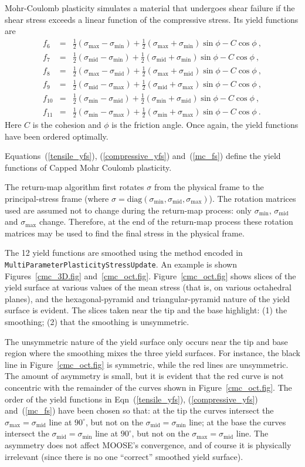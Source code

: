 \documentclass[]{scrreprt}
\newcommand{\ha}{\mbox{$\frac{1}{2}$}}
\newcommand{\smax}{\sigma_{\mathrm{max}}}
\newcommand{\smid}{\sigma_{\mathrm{mid}}}
\newcommand{\smin}{\sigma_{\mathrm{min}}}
\begin{document}
Mohr-Coulomb plasticity simulates a material that undergoes shear
failure if the shear stress exceeds a linear function of the
compressive stress.  Its yield functions are
\begin{eqnarray}
f_{6} & = & \ha (\smax - \smin) +
\ha(\smax+\smin)\sin\phi - C\cos\phi \ , \nonumber \\
f_{7} & = & \ha (\smid - \smin) +
\ha(\smid+\smin)\sin\phi - C\cos\phi \ , \nonumber \\
f_{8} & = & \ha (\smax - \smid) +
\ha(\smax+\smid)\sin\phi - C\cos\phi \ , \nonumber \\
f_{9} & = & \ha (\smid - \smax) +
\ha(\smid+\smax)\sin\phi - C\cos\phi \ , \nonumber \\
f_{10} & = & \ha (\smin - \smid) +
\ha(\smin+\smid)\sin\phi - C\cos\phi \ , \nonumber \\
f_{11} & = & \ha (\smin - \smax) +
\ha(\smin+\smax)\sin\phi - C\cos\phi \ .
\label{mc_fs}
\end{eqnarray}
Here $C$ is the cohesion and $\phi$ is the friction angle.  Once
again, the yield functions have been ordered optimally.

Equations~(\ref{tensile_yfs}), (\ref{compressive_yfs})
and~(\ref{mc_fs}) define the yield functions of Capped Mohr Coulomb plasticity.

The return-map algorithm first rotates $\sigma$ from the physical
frame to the
principal-stress frame (where $\sigma = \mbox{diag}(\smin, \smid,
\smax)$).  The rotation matrices used are assumed not to change
during the return-map process: only $\smin$, $\smid$ and
$\smax$ change.  Therefore, at the end of the
return-map process these rotation matrices may be used to find the
final stress in the physical frame.

The 12 yield functions are smoothed using the method encoded in {\tt
  MultiParameterPlasticityStressUpdate}.  An example is shown
Figures~\ref{cmc_3D.fig} and~\ref{cmc_oct.fig}.
Figure~\ref{cmc_oct.fig} shows slices of the yield surface at various
values of the mean stress (that is, on various octahedral planes), and
the hexagonal-pyramid and triangular-pyramid nature of the yield
surface is evident.  The slices taken near the tip and the base
highlight: (1) the smoothing; (2) that the smoothing is unsymmetric.

The unsymmetric nature of the
yield surface only occurs near the tip and base region where the smoothing
mixes the three yield surfaces.  For instance, the black line in
Figure~\ref{cmc_oct.fig} is symmetric, while the red
lines are unsymmetric.  The amount of asymmetry is small, but it is
evident that the red curve is not concentric with the remainder of the
curves shown in Figure~\ref{cmc_oct.fig}.  The order of the yield
functions in Eqn~(\ref{tensile_yfs}), (\ref{compressive_yfs})
and~(\ref{mc_fs}) have been chosen so that: at the tip the curves
intersect the $\smax=\smid$ line at $90^{\circ}$, but not
on the $\smid=\smin$ line; at the base the curves
intersect the $\smid=\smin$ line at $90^{\circ}$, but not
on the $\smax=\smid$ line.  The
asymmetry does not affect MOOSE's convergence, and of course it is
physically irrelevant (since there is no one ``correct'' smoothed
yield surface).
\end{document}
